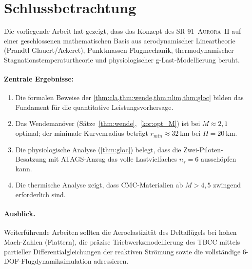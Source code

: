 ﻿\documentclass[12pt,a4paper]{article}
\theoremstyle{plain}
\theoremstyle{definition}
\theoremstyle{remark}
\newcommand{\SR}{\textsc{SR-91~Aurora~II}}
\begin{document}
\section*{Schlussbetrachtung}

Die vorliegende Arbeit hat gezeigt, dass das Konzept des \SR{} auf einer
geschlossenen mathematischen Basis aus aerodynamischer Lineartheorie
(Prandtl-Glauert/Ackeret), Punktmassen-Flugmechanik, thermodynamischer
Stagnationstemperaturtheorie und physiologischer g-Last-Modellierung beruht.

\paragraph{Zentrale Ergebnisse:}
\begin{enumerate}
  \item Die formalen Beweise der \cref{thm:cla,thm:wende,thm:nlim,thm:gloc}
        bilden das Fundament für die quantitative Leistungsvorhersage.
  \item Das Wendemanöver (Sätze~\ref{thm:wende},~\ref{kor:opt_M}) ist bei
        $M \approx 2{,}1$ optimal; der minimale Kurvenradius beträgt
        $r_{min} \approx \SI{32}{\kilo\metre}$ bei $H = \SI{20}{\kilo\metre}$.
  \item Die physiologische Analyse (\cref{thm:gloc}) belegt, dass die
        Zwei-Piloten-Besatzung mit ATAGS-Anzug das volle Lastvielfaches
        $n_s = 6$ ausschöpfen kann.
  \item Die thermische Analyse zeigt, dass CMC-Materialien ab $M > 4{,}5$
        zwingend erforderlich sind.
\end{enumerate}

\paragraph{Ausblick.}
Weiterführende Arbeiten sollten die Aeroelastizität des Deltaflügels bei
hohen Mach-Zahlen (Flattern), die präzise Triebwerksmodellierung des TBCC
mittels partieller Differentialgleichungen der reaktiven Strömung sowie
die vollständige 6-DOF-Flugdynamiksimulation adressieren.

\end{document}
